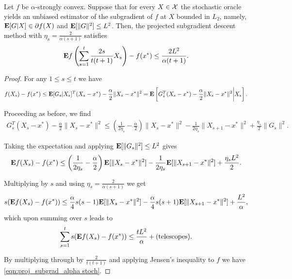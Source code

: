 \begin{theorem}
\label{thm:projectedgradalphastoch}
Let $f$ be $\alpha$-strongly convex. Suppose that for every $X \in \mathcal{X}$ the stochastic oracle yields an unbiased estimator of the subgradient of $f$ at $X$ bounded in $L_2$, namely, $\mathbf{E}[G |X]\in \partial f(X)$ and $\mathbf{E}[\|G\|^2] \leq L^2$. Then, the projected subgradient descent method with $\eta_s = \frac{2}{\alpha(s+1)}$ satisfies 
\begin{equation} \label{eqn:proj_subgrad_alpha stoch}
\mathbf{E} f\left( \sum_{s=1}^t \frac{2s}{t(t+1)}X_s \right) - f(x^*) \leq \frac{2L^2}{\alpha(t+1)}.
\end{equation}
\begin{proof}
For any $1 \leq s \leq t$ we have
\begin{align*}
	f(X_s) - f(x^*)
	\le \mathbf{E} [G_s|X_s]^T(X_s - x^*) - \frac{\alpha}{2}\|X_s - x^*\|^2
	= \mathbf{E} \left[G_s^T(X_s - x^*) - \frac{\alpha}{2}\|X_s - x^*\|^2 \bigg| X_s \right].
\end{align*}

Proceeding as before, we find
\begin{align*}
	G_s^T(X_s - x^*) - \frac{\alpha}{2}\|X_s - x^*\|^2
	\le \left( \frac{1}{2\eta_s} - \frac{\alpha}{2} \right) \|X_s - x^*\|^2 - \frac{1}{2\eta_s}\|X_{s+1} - x^*\|^2 + \frac{\eta_s}{2} \|G_s\|^2.
\end{align*}

Taking the expectation and applying $\mathbf{E}[\|G_s\|^2] \le L^2$ gives
\begin{align*}
	\mathbf{E} f(X_s) - f(x^*)
	\le \left( \frac{1}{2\eta_s} - \frac{\alpha}{2} \right) \mathbf{E}[\|X_s - x^*\|^2] - \frac{1}{2\eta_s}\mathbf{E} [\|X_{s+1} - x^*\|^2] + \frac{\eta_s L^2}{2}.
\end{align*}

Multiplying by $s$ and using $\eta_s = \frac{2}{\alpha(s+1)}$ we get
\begin{align*}
	s(\mathbf{E} f(X_s) - f(x^*))
	\le \frac{\alpha}{4}s(s-1) \mathbf{E}[\|X_s - x^*\|^2] - \frac{\alpha}{4}s(s+1) \mathbf{E} [\|X_{s+1} - x^*\|^2] + \frac{L^2}{\alpha},
\end{align*}
which upon summing over $s$ leads to
\[
\sum_{s=1}^t s(\mathbf{E} f(X_s) - f(x^*)) \le \frac{tL^2}{\alpha} + \text{(telescopes)}.
\]

By multiplying through by $\frac{2}{t(t+1)}$ and applying Jensen's inequality to $f$ we have \eqref{eqn:proj_subgrad_alpha stoch}.
\end{proof}
\end{theorem}

